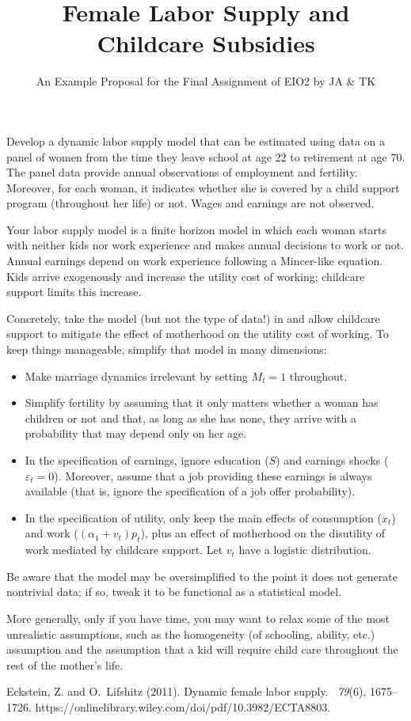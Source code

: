 \documentclass[fleqn,12pt]{article}
\title{Female Labor Supply and Childcare Subsidies}
\author{An Example Proposal for the Final Assignment of EIO2 by JA \& TK}
\date{}
\begin{document}
\maketitle

Develop a dynamic labor supply model that can be estimated using data on a panel of women from the time they leave school at age 22 to retirement at age 70. The panel data provide annual observations of employment and fertility. Moreover, for each woman, it indicates whether she is covered by a child support program (throughout her life) or not. Wages and earnings are not observed. 

Your labor supply model is a finite horizon model in which each woman starts with neither kids nor work experience and makes annual decisions to work or not. Annual earnings depend on work experience following a Mincer-like equation. Kids arrive exogenously and increase the utility cost of working; childcare support limits this increase. 

Concretely, take the model (but not the type of data!) in \citet[][Section 3]{https://doi.org/10.3982/ECTA8803} and allow childcare support to mitigate the effect of motherhood on the utility cost of working. To keep things manageable, simplify that model in many dimensions:
\begin{itemize}
\item Make marriage dynamics irrelevant by setting  $M_t=1$ throughout.
\item Simplify fertility by assuming that it only matters whether a woman has children or not and that, as long as she has none, they arrive with a probability that may depend only on her age. 
\item In the specification of earnings, ignore education ($S$) and earnings shocks ($\varepsilon_t=0$). Moreover, assume that a job providing these earnings is always available (that is, ignore the specification of a job offer probability).
\item In the specification of utility, only keep the main effects of consumption ($x_t$) and work ($(\alpha_1+v_t)p_t$), plus an effect of motherhood on the disutility of work mediated by childcare support. Let  $v_t$ have a logistic distribution.
\end{itemize}
Be aware that the model may be oversimplified to the point it does not generate nontrivial data; if so, tweak it to be functional as a statistical model. 

More generally, only if you have time, you may want to relax some of the most unrealistic assumptions, such as the homogeneity (of schooling, ability, etc.) assumption and the assumption that a kid will require child care throughout the rest of the mother's life. 

\begin{thebibliography}{}

Eckstein, Z. and O.~Lifshitz (2011).
\newblock Dynamic female labor supply.
~{\em 79\/}(6), 1675--1726.
\newblock https://onlinelibrary.wiley.com/doi/pdf/10.3982/ECTA8803.

\end{thebibliography}
\end{document}
